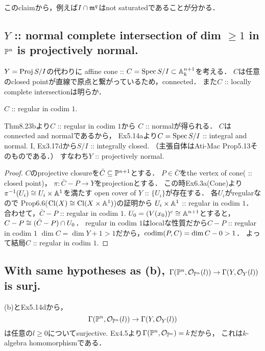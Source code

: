 \documentclass[a4paper]{jsarticle}
\newcommand{\Cl}{\mathrm{Cl}}
\begin{document}
    このclaimから，例えば$I \cap \mathfrak{m}^q$はnot saturatedであることが分かる．

    \subsection{$Y$ :: normal complete intersection of dim $ \geq 1$ in $\mathbb{P}^n$ is projectively normal.}
    $Y=\operatorname{Proj} S/I$の代わりに
    affine cone :: $C=\operatorname{Spec} S/I \subset \mathbb{A}^{n+1}_k$を考える．
    $C$は任意のclosed pointが直線で原点と繋がっているため，connected．
    また$C$ :: locally complete intersectionは明らか．

    \begin{Claim}
        $C$ :: regular in codim $1$.
    \end{Claim}
    Thm8.23bより$C$ :: regular in codim $1$から
    $C$ :: normalが得られる．
    $C$はconnected and normalであるから，
    Ex5.14aより$C=\operatorname{Spec} S/I$ :: integral and normal.
    I, Ex3.17dから$S/I$ :: integrally closed.
    （主張自体はAti-Mac Prop5.13そのものである．）
    すなわち$Y$ :: projectively normal.

    \begin{proof}
        $C$のprojective closureを$\bar{C} \subseteq \mathbb{P}^{n+1}$とする．
        $P \in \bar{C}$をthe vertex of cone( :: closed point)，
        $\pi: \bar{C}-P \to Y$をprojectionとする．
        この時Ex6.3a(Cone)より$\pi^{-1}(U_i) \cong U_i \times \mathbb{A}^1$を満たす
        open cover of $Y$ :: $\{U_i\}$が存在する．
        各$U_i$がregularなので
        Prop6.6($\Cl(X) \iso \Cl(X \times \affine^1)$)の証明から
        $U_i \times \mathbb{A}^1$ :: regular in codim $1$．
        合わせて，$\bar{C}-P$ :: regular in codim $1$.
        $U_0=(V(x_0))^c \cong \mathbb{A}^{n+1}$とすると，
        $C-P \cong (\bar{C}-P) \cap U_0$．
        regular in codim $1$はlocalな性質だから$C-P$ :: regular in codim $1$
        $\dim C=\dim Y+1>1$だから，$\operatorname{codim}(P, C)=\dim C-0>1$．
        よって結局$C$ :: regular in codim $1$.
    \end{proof}

    \subsection{With same hypotheses as (b), 
        $\Gamma(\mathbb{P}^n, \mathcal{O}_{\mathbb{P}^n}(l)) \to \Gamma(Y, \mathcal{O}_Y(l))$ is surj.}
    (b)とEx5.14dから，
    \[ \Gamma(\mathbb{P}^n, \mathcal{O}_{\mathbb{P}^n}(l)) \to \Gamma(Y, \mathcal{O}_Y(l)) \]
    は任意の$l \geq 0$についてsurjective.
    Ex4.5より$\Gamma(\mathbb{P}^n, \mathcal{O}_{\mathbb{P}^n})=k$だから，
    これは$k$-algebra homomorphismである．
\end{document}
